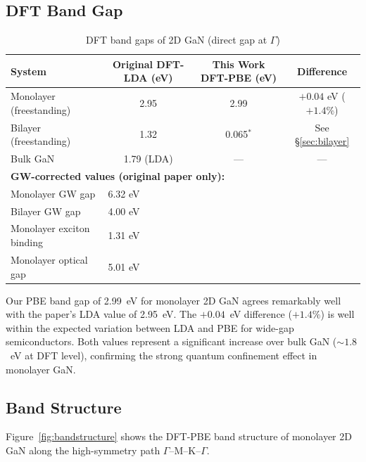 \documentclass[11pt]{article}
\begin{document}
\subsection{DFT Band Gap}

\begin{table}[H]
\centering
\caption{DFT band gaps of 2D GaN (direct gap at $\Gamma$)}
\label{tab:bandgaps}
\begin{tabular}{@{}lccc@{}}
\toprule
\textbf{System} & \textbf{Original DFT-LDA (eV)} & \textbf{This Work DFT-PBE (eV)} & \textbf{Difference} \\
\midrule
Monolayer (freestanding) & 2.95 & 2.99 & $+0.04$ eV ($+1.4\%$) \\
Bilayer (freestanding) & 1.32 & 0.065$^*$ & See \S\ref{sec:bilayer} \\
Bulk GaN & 1.79 (LDA) & --- & --- \\
\midrule
\multicolumn{4}{l}{\textbf{GW-corrected values (original paper only):}} \\
Monolayer GW gap & \multicolumn{3}{l}{6.32 eV} \\
Bilayer GW gap & \multicolumn{3}{l}{4.00 eV} \\
Monolayer exciton binding & \multicolumn{3}{l}{1.31 eV} \\
Monolayer optical gap & \multicolumn{3}{l}{5.01 eV} \\
\bottomrule
\end{tabular}
\end{table}

Our PBE band gap of 2.99~eV for monolayer 2D GaN agrees remarkably well with the paper's LDA value of 2.95~eV. The $+0.04$~eV difference ($+1.4\%$) is well within the expected variation between LDA and PBE for wide-gap semiconductors. Both values represent a significant increase over bulk GaN ($\sim 1.8$~eV at DFT level), confirming the strong quantum confinement effect in monolayer GaN.

\subsection{Band Structure}

Figure~\ref{fig:bandstructure} shows the DFT-PBE band structure of monolayer 2D GaN along the high-symmetry path $\Gamma$--M--K--$\Gamma$.
\end{document}
